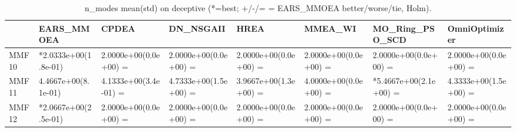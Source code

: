 \begin{table}[t]
\centering
\caption{n_modes mean(std) on deceptive (*=best; +/-/= = EARS_MMOEA better/worse/tie, Holm).}
\label{tab:deceptive_n_modes}
\begin{tabular}{llllllll}
\toprule
 & EARS\_MMOEA & CPDEA & DN\_NSGAII & HREA & MMEA\_WI & MO\_Ring\_PSO\_SCD & OmniOptimizer \\
\midrule
MMF10 & *2.0333e+00(1.8e-01) & 2.0000e+00(0.0e+00) = & 2.0000e+00(0.0e+00) = & 2.0000e+00(0.0e+00) = & 2.0000e+00(0.0e+00) = & 2.0000e+00(0.0e+00) = & 2.0000e+00(0.0e+00) = \\
MMF11 & 4.4667e+00(8.1e-01) & 4.1333e+00(3.4e-01) = & 4.7333e+00(1.5e+00) = & 3.9667e+00(1.3e+00) = & 4.0000e+00(0.0e+00) = & *5.4667e+00(2.1e+00) = & 4.3333e+00(1.5e+00) = \\
MMF12 & *2.0667e+00(2.5e-01) & 2.0000e+00(0.0e+00) = & 2.0000e+00(0.0e+00) = & 2.0000e+00(0.0e+00) = & 2.0000e+00(0.0e+00) = & 2.0000e+00(0.0e+00) = & 2.0000e+00(0.0e+00) = \\
\bottomrule
\end{tabular}
\end{table}
